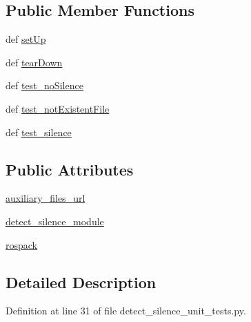 \subsection*{Public Member Functions}
\begin{DoxyCompactItemize}
\item 
def \hyperlink{classdetect__silence__unit__tests_1_1TestAudioProcessing_a58df9540e3c490ad3060290a1f589714}{set\-Up}
\item 
def \hyperlink{classdetect__silence__unit__tests_1_1TestAudioProcessing_a04d23b9397b02367663ed9baca6c6860}{tear\-Down}
\item 
def \hyperlink{classdetect__silence__unit__tests_1_1TestAudioProcessing_a32cc654195575a3036122a1902dc612b}{test\-\_\-no\-Silence}
\item 
def \hyperlink{classdetect__silence__unit__tests_1_1TestAudioProcessing_acfd75c9a5d2b40194db63e2722870d20}{test\-\_\-not\-Existent\-File}
\item 
def \hyperlink{classdetect__silence__unit__tests_1_1TestAudioProcessing_a77b1ac9c346d4b12b4beed73d546acff}{test\-\_\-silence}
\end{DoxyCompactItemize}
\subsection*{Public Attributes}
\begin{DoxyCompactItemize}
\item 
\hyperlink{classdetect__silence__unit__tests_1_1TestAudioProcessing_a7c1bc7c6a2cca72c00260613a7c20bec}{auxiliary\-\_\-files\-\_\-url}
\item 
\hyperlink{classdetect__silence__unit__tests_1_1TestAudioProcessing_a091f6edd6c581d6bfb165a2aca2fd170}{detect\-\_\-silence\-\_\-module}
\item 
\hyperlink{classdetect__silence__unit__tests_1_1TestAudioProcessing_a484d0d9f66b7ff88516f206070db6afb}{rospack}
\end{DoxyCompactItemize}


\subsection{Detailed Description}


Definition at line 31 of file detect\-\_\-silence\-\_\-unit\-\_\-tests.\-py.



